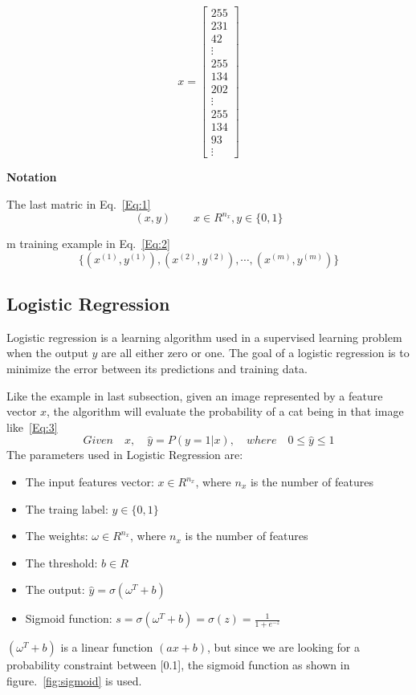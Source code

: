 \documentclass[a4paper]{article}
\begin{document}
\begin{equation*}
x=\begin{bmatrix}
	255\\
    231\\
    42\\
    \vdots \\
    255\\
    134\\
    202\\
    \vdots \\
    255\\
    134\\
    93\\
    \vdots 
\end{bmatrix}
\end{equation*}

\textbf{Notation}\par
The last matric in Eq.~\ref{Eq:1}
\begin{equation}
(x,y) \quad \quad x \in R^{n_x},y \in \{0,1\}
\label{Eq:1}
\end{equation} \par
m training example in Eq.~\ref{Eq:2}
\begin{equation}
\{(x^{(1)},y^{(1)}),(x^{(2)},y^{(2)}),\cdots,(x^{(m)},y^{(m)})\}
\label{Eq:2}
\end{equation}


\subsection{Logistic Regression}
Logistic regression is a learning algorithm used in a supervised learning problem when the output $y$ are all either zero or one. The goal of a logistic regression is to minimize the error between its predictions and training data.\par
Like the example in last subsection, given  an image represented by a feature vector  $x$, the algorithm will evaluate the probability of a cat being in that image like~\ref{Eq:3}
\begin{equation}
Given \quad x, \quad \hat{y}=P(y=1|x),\quad where \quad 0 \leq \hat{y} \leq 1
\label{Eq:3}
\end{equation}
The parameters used in Logistic Regression are:
\begin{itemize}
\item The input features vector: $x \in R^{n_x} $, where $n_x$ is the number of features
\item The traing label: $y \in \{0,1\}$
\item The weights: $\omega \in R^{n_x}$, where $n_x$ is the number of features
\item The threshold: $b \in R$
\item The output: $\hat{y}=\sigma(\omega^T+b)$
\item Sigmoid function: $s=\sigma(\omega^T+b)=\sigma(z)=\frac{1}{1+e^{-z}}$
\end{itemize}\par
$(\omega^T+b)$ is a linear function $(ax+b)$, but since we are looking for a probability constraint between [0.1], the sigmoid function as shown in figure.~\ref{fig:sigmoid} is used.
\end{document}
